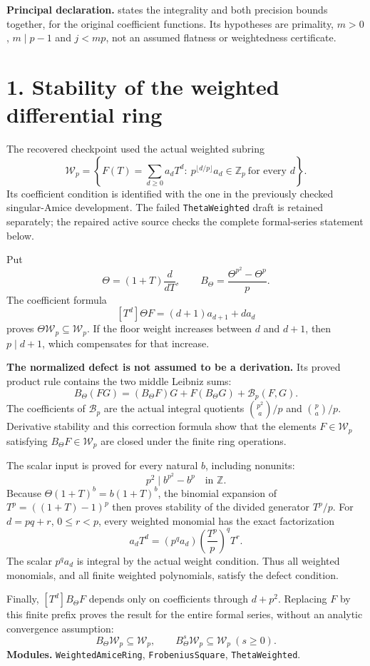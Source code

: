 \documentclass[11pt]{article}
\newcommand{\Z}{\mathbb Z}\newcommand{\Q}{\mathbb Q}\newcommand{\N}{\mathbb N}
\newcommand{\Wp}{\mathcal W_p}\newcommand{\Hp}{\mathcal H(\Z_p)}
\begin{document}
\textbf{Principal declaration.}  states the integrality and both precision bounds together, for the original coefficient functions. Its hypotheses are primality, $m>0$, $m\mid p-1$ and $j<mp$, not an assumed flatness or weightedness certificate.
\newpage
\section*{1. Stability of the weighted differential ring}
The recovered checkpoint used the actual weighted subring
\[
 \Wp=\left\{F(T)=\sum_{d\ge0}a_dT^d:\
 p^{\lfloor d/p\rfloor}a_d\in\Z_p\ \text{for every }d\right\}.
\]
Its coefficient condition is identified with the one in the previously checked singular-Amice development. The failed \texttt{ThetaWeighted} draft is retained separately; the repaired active source checks the complete formal-series statement below.

Put
\[
 \Theta=(1+T)\frac{d}{dT},\qquad
 B_\Theta=\frac{\Theta^{p^2}-\Theta^p}{p}.
\]
The coefficient formula
\[
 [T^d]\Theta F=(d+1)a_{d+1}+da_d
\]
proves $\Theta\Wp\subseteq\Wp$. If the floor weight increases between $d$ and $d+1$, then $p\mid d+1$, which compensates for that increase.

\textbf{The normalized defect is not assumed to be a derivation.}
Its proved product rule contains the two middle Leibniz sums:
\[
 B_\Theta(FG)=(B_\Theta F)G+F(B_\Theta G)+\mathcal B_p(F,G).
\]
The coefficients of $\mathcal B_p$ are the actual integral quotients
$\binom{p^2}{a}/p$ and $\binom pa/p$. Derivative stability and this correction formula show that the elements $F\in\Wp$ satisfying $B_\Theta F\in\Wp$ are closed under the finite ring operations.

The scalar input is proved for every natural $b$, including nonunits:
\[
 \boxed{p^2\mid b^{p^2}-b^p\quad\text{in }\Z.}
\]
Because $\Theta(1+T)^b=b(1+T)^b$, the binomial expansion of $T^p=((1+T)-1)^p$ then proves stability of the divided generator $T^p/p$. For $d=pq+r$, $0\le r<p$, every weighted monomial has the exact factorization
\[
 a_dT^d=(p^qa_d)\left(\frac{T^p}{p}\right)^qT^r.
\]
The scalar $p^qa_d$ is integral by the actual weight condition. Thus all weighted monomials, and all finite weighted polynomials, satisfy the defect condition.

Finally, $[T^d]B_\Theta F$ depends only on coefficients through $d+p^2$. Replacing $F$ by this finite prefix proves the result for the entire formal series, without an analytic convergence assumption:
\[
 \boxed{B_\Theta\Wp\subseteq\Wp,\qquad B_\Theta^s\Wp\subseteq\Wp\ (s\ge0).}
\]
\textbf{Modules.} \texttt{WeightedAmiceRing}, \texttt{FrobeniusSquare}, \texttt{ThetaWeighted}.
\newpage
\end{document}
